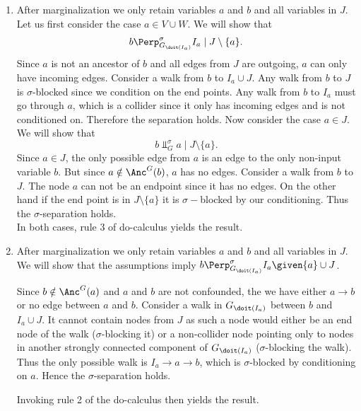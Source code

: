 \begin{enumerate}
	\begin{gradedsolution}
		\begin{enumerate}
			\item After marginalization we only retain variables $a$ and $b$ and all variables in $J$. Let us first consider the case $a \in V \cup W$. We will show that
			$$b \Perp^\sigma_{G_{\doit(I_a)}} I_a \mid J \setminus \{a\}.$$
			Since $a$ is not an ancestor of $b$ and all edges from $J$ are outgoing, $a$ can only have incoming edges. Consider a walk from $b$ to $I_a \cup J$. Any walk from $b$ to $J$ is $\sigma$-blocked since we condition on the end points. Any walk from $b$ to $I_a$ must go through $a$, which is a collider since it only has incoming edges and is not conditioned on. Therefore the separation holds.
			Now consider the case $a \in J$. We will show that
			$$b \Perp^\sigma_{G} a \mid J \setminus \{a\}.$$
			Since $a \in J$, the only possible edge from $a$ is an edge to the only non-input variable $b$. But since $a \notin \Anc^G(b)$, $a$ has no edges. Consider a walk from $b$ to $J$. The node $a$ can not be an endpoint since it has no edges. On the other hand if the end point is in $J \setminus \{a\}$ it is $\sigma-$blocked by our conditioning. Thus the $\sigma$-separation holds.\\
			In both cases, rule 3 of do-calculus yields the result.
			\item After marginalization we only retain variables $a$ and $b$ and all variables in $J$. We will show that the assumptions imply $b \Perp^\sigma_{G_{\doit(I_a)}} I_a \given \{a\} \cup J$.

			Since $b \notin \Anc^G(a)$ and $a$ and $b$ are not confounded, the we have either $a \to b$ or no edge between $a$ and $b$. Consider a walk in $G_{\doit(I_a)}$ between $b$ and $I_a \cup J$. It cannot contain nodes from $J$ as such a node would either be an end node of the walk ($\sigma$-blocking it) or a non-collider node pointing only to nodes in another strongly connected component of $G_{\doit(I_a)}$
			($\sigma$-blocking the walk). Thus the only possible walk is $I_a \to a \to b$, which is $\sigma$-blocked by conditioning on $a$. Hence the $\sigma$-separation holds.

			Invoking rule 2 of the do-calculus then yields the result.
		\end{enumerate}
	\end{gradedsolution}

\end{enumerate}

